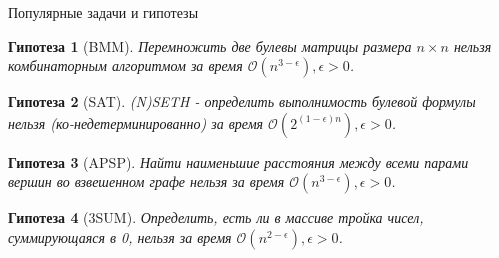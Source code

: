\documentclass{beamer}
\newtheorem{probl}{Гипотеза}
\begin{document}
\begin{frame}{Популярные задачи и гипотезы}
		
	\begin{probl}[BMM]
		Перемножить две булевы матрицы размера $n \times n$ нельзя комбинаторным алгоритмом за время $\mathcal{O}(n^{3 - \epsilon}), \epsilon > 0$.
	\end{probl}

	\begin{probl}[SAT]
		(N)SETH - определить выполнимость булевой формулы нельзя (ко-недетерминированно) за время $\mathcal{O}(2^{(1 - \epsilon)n}), \epsilon > 0$.
	\end{probl}
	
	\begin{probl}[APSP]
		Найти наименьшие расстояния между всеми парами вершин во взвешенном графе нельзя за время $\mathcal{O}(n^{3 - \epsilon}), \epsilon > 0$.	\end{probl}

	\begin{probl}[3SUM]
		Определить, есть ли в массиве тройка чисел, суммирующаяся в 0, нельзя за время $\mathcal{O}(n^{2 - \epsilon}), \epsilon > 0$.
	\end{probl}
\end{frame}
\end{document}
